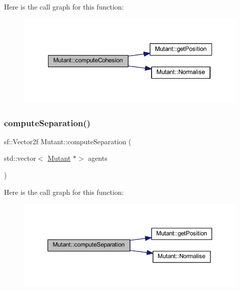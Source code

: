 Here is the call graph for this function\+:
\nopagebreak
\begin{figure}[H]
\begin{center}
\leavevmode
\includegraphics[width=348pt]{class_mutant_ab6daf2a25a5a96ccc672ef00d3aa90d4_cgraph}
\end{center}
\end{figure}
\mbox{\label{class_mutant_a3477994ce821511033006866f2f3b987}} 
\subsubsection{\texorpdfstring{compute\+Separation()}{computeSeparation()}}
{\footnotesize\ttfamily sf\+::\+Vector2f Mutant\+::compute\+Separation (\begin{DoxyParamCaption}\item[{std\+::vector$<$ \hyperlink{class_mutant}{Mutant} $\ast$$>$}]{agents }\end{DoxyParamCaption})}

Here is the call graph for this function\+:
\nopagebreak
\begin{figure}[H]
\begin{center}
\leavevmode
\includegraphics[width=350pt]{class_mutant_a3477994ce821511033006866f2f3b987_cgraph}
\end{center}
\end{figure}
\mbox{\label{class_mutant_aaa71f2f6d0fe2be008db453bb9673d4c}} 
